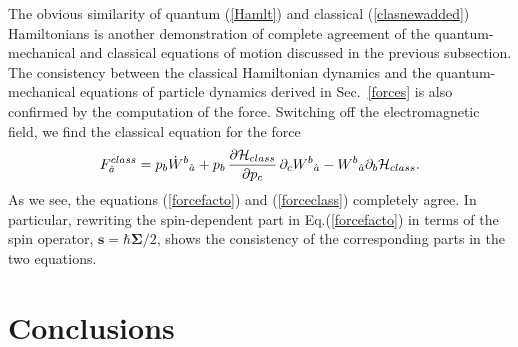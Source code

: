 \documentclass[preprint,showpacs,preprintnumbers,eqsecnum,amsmath,amssymb]{revtex4-1}
\begin{document}
The obvious similarity of quantum (\ref{Hamlt}) and classical (\ref{clasnewadded})
Hamiltonians is another demonstration of complete agreement of the quantum-mechanical
and classical equations of motion discussed in the previous subsection.
The consistency between the classical Hamiltonian dynamics and the quantum-mechanical
equations of particle dynamics derived in Sec.~\ref{forces} is also confirmed by
the computation of the force. Switching off the electromagnetic field, we find
the classical equation for the force  
\begin{eqnarray}\label{forceclass}
F_{\hat a}^{class} = p_b\dot{W}^b{}_{\hat a} + p_b\,{\frac {\partial{\cal H}_{class}}
{\partial p_c}}\,\partial_c{W}^b{}_{\hat a} - {W}^b{}_{\hat a}\partial_b{\cal H}_{class}.
\end{eqnarray}
As we see, the equations (\ref{forcefacto}) and (\ref{forceclass}) completely
agree. In particular, rewriting the spin-dependent part in Eq.(\ref{forcefacto})
in terms of the spin operator, $\bm s=\hbar\bm\Sigma/2$, shows the consistency of
the corresponding parts in the two equations. 

\section{Conclusions}\label{final}
\end{document}
